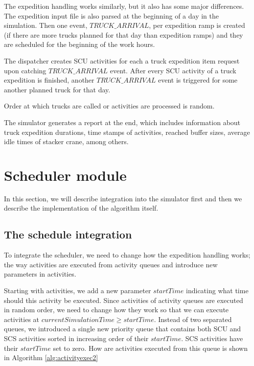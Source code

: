 \documentclass{ctuthesis}
\begin{document}
The expedition handling works similarly, but it also has some major differences. The expedition input file is also parsed at the beginning of a day in the simulation. Then one event, $TRUCK\_ARRIVAL$, per expedition ramp is created (if there are more trucks planned for that day than expedition ramps) and they are scheduled for the beginning of the work hours. 

The dispatcher creates SCU activities for each a truck expedition item request upon catching $TRUCK\_ARRIVAL$ event. After every SCU activity of a truck expedition is finished, another $TRUCK\_ARRIVAL$ event is triggered for some another planned truck for that day.  

Order at which trucks are called or activities are processed is random.

The simulator generates a report at the end, which includes information about truck expedition durations, time stamps of activities, reached buffer sizes, average idle times of stacker crane, among others.

\section{Scheduler module}

In this section, we will describe integration into the simulator first and then we describe the implementation of the algorithm itself.

\subsection{The schedule integration}
\label{subsec:scheduleintegration}

To integrate the scheduler, we need to change how the expedition handling works; the way activities are executed from activity queues and introduce new parameters in activities. 

Starting with activities, we add a new parameter $startTime$ indicating what time should this activity be executed. Since activities of activity queues are executed in random order, we need to change how they work so that we can execute activities at $currentSimulationTime \geq startTime$. Instead of two separated queues,  we introduced a single new priority queue that contains both SCU and SCS activities sorted in increasing order of their $startTime$. SCS activities have their $startTime$ set to zero. How are activities executed from this queue is shown in Algorithm \ref{alg:activityexec2}
\end{document}
